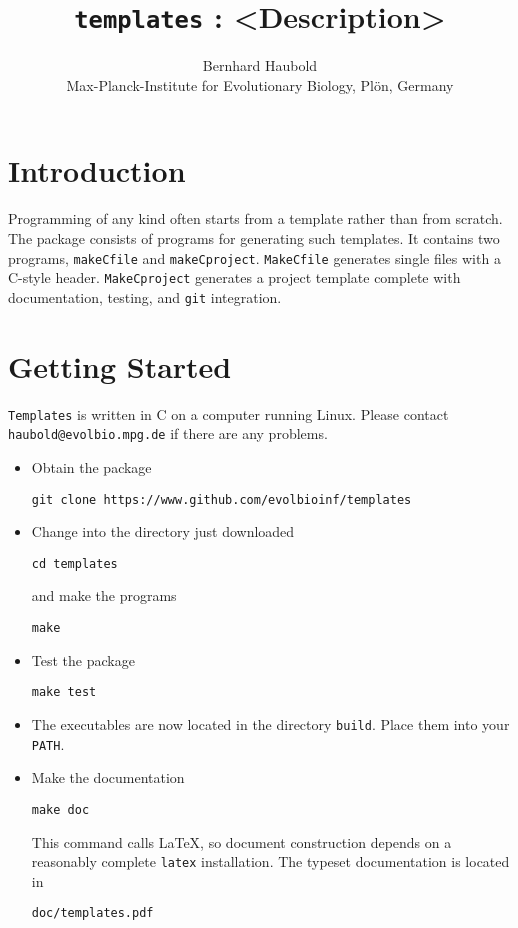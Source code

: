 \documentclass[a4paper, english]{article}
\begin{document}
\title{\texttt{templates} : <Description>}
\author{Bernhard Haubold\\\small Max-Planck-Institute for Evolutionary
  Biology, Pl\"on, Germany}
\date{}
\maketitle
\section{Introduction} 
Programming of any kind often starts from a template rather than from
scratch. The package  consists of programs for
generating such templates. It contains two programs,
\texttt{makeCfile} and \texttt{makeCproject}. \texttt{MakeCfile}
generates single files with a C-style header. \texttt{MakeCproject}
generates a project template complete with documentation, testing, and
\texttt{git} integration.

\section{Getting Started}
\texttt{Templates} is written in C on a computer running Linux.
Please contact \texttt{haubold@evolbio.mpg.de} if there are any problems.
\begin{itemize}
\item Obtain the package
\begin{verbatim}
git clone https://www.github.com/evolbioinf/templates
\end{verbatim}
\item Change into the directory just downloaded
\begin{verbatim}
cd templates
\end{verbatim}
and make the programs
\begin{verbatim}
make
\end{verbatim}
\item Test the package
\begin{verbatim}
make test
\end{verbatim}
\item The executables are now located in the directory
  \texttt{build}. Place them into your \texttt{PATH}.
\item  Make the documentation
\begin{verbatim}
make doc
\end{verbatim}
This command calls \LaTeX{}, so document construction depends on a reasonably
complete \texttt{latex} installation. The typeset documentation is located
in
\begin{verbatim}
doc/templates.pdf
\end{verbatim}
\end{itemize}
\end{document}
